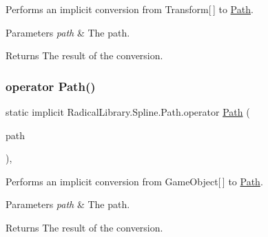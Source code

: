 Performs an implicit conversion from Transform\mbox{[}$\,$\mbox{]} to \hyperlink{class_radical_library_1_1_spline_1_1_path}{Path}. 


\begin{DoxyParams}{Parameters}
{\em path} & The path.\\
\hline
\end{DoxyParams}
\begin{DoxyReturn}{Returns}
The result of the conversion.
\end{DoxyReturn}
\mbox{\label{class_radical_library_1_1_spline_1_1_path_a426968ba542f38021b57a469d6980d34}} 
\subsubsection{\texorpdfstring{operator Path()}{operator Path()}\hspace{0.1cm}{\footnotesize\ttfamily [3/3]}}
{\footnotesize\ttfamily static implicit Radical\+Library.\+Spline.\+Path.\+operator \hyperlink{class_radical_library_1_1_spline_1_1_path}{Path} (\begin{DoxyParamCaption}\item[{Game\+Object \mbox{[}$\,$\mbox{]}}]{path }\end{DoxyParamCaption})\hspace{0.3cm}{\ttfamily [inline]}, {\ttfamily [static]}}



Performs an implicit conversion from Game\+Object\mbox{[}$\,$\mbox{]} to \hyperlink{class_radical_library_1_1_spline_1_1_path}{Path}. 


\begin{DoxyParams}{Parameters}
{\em path} & The path.\\
\hline
\end{DoxyParams}
\begin{DoxyReturn}{Returns}
The result of the conversion.
\end{DoxyReturn}
\mbox{\label{class_radical_library_1_1_spline_1_1_path_aee769e4853c6917039d1fd15035a4538}} 
